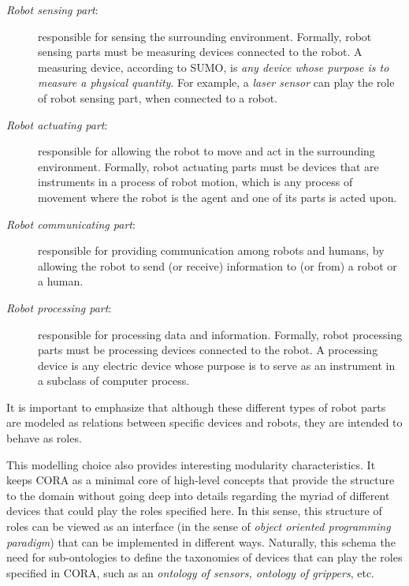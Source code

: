 \documentclass[preprint,12pt]{elsarticle}
\begin{document}
\begin{description}
    \item[\emph{Robot sensing part}:] responsible for sensing the surrounding environment. Formally, robot sensing parts must be measuring devices connected to the robot. A measuring device, according to SUMO, is \emph{any device whose purpose is to measure a physical quantity}. For example, a \emph{laser sensor} can play the role of robot sensing part, when connected to a robot.
    \item[\emph{Robot actuating part}:] responsible for allowing the robot to move and act in the surrounding environment. Formally, robot actuating parts must be devices that are instruments in a process of robot motion, which is any process of movement where the robot is the agent and one of its parts is acted upon.
    \item[\emph{Robot communicating part}:] responsible for providing communication among robots and humans, by allowing the robot to send (or receive) information to (or from) a robot or a human.
    \item[\emph{Robot processing part}:] responsible for processing data and information. Formally, robot processing parts must be processing devices connected to the robot. A processing device is any electric device whose purpose is to serve as an instrument in a subclass of computer process.
\end{description}

It is important to emphasize that although these different types of robot parts are modeled as relations between specific devices and robots, they are intended to behave as roles. 

This modelling choice also provides interesting modularity characteristics. It keeps CORA as a minimal core of high-level concepts that provide the structure to the domain without going deep into details regarding the myriad of different devices that could play the roles specified here. In this sense, this structure of roles can be viewed as an interface (in the sense of \emph{object oriented programming paradigm}) that can be implemented in different ways. Naturally, this schema the need for sub-ontologies to define the taxonomies of devices that can play the roles specified in CORA, such as an \textit{ontology of sensors, ontology of grippers}, etc.   
 

\end{document}
